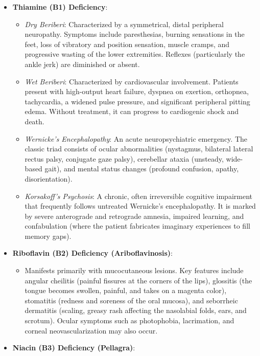 \begin{itemize}
    \item \textbf{Thiamine (B1) Deficiency}:
    \begin{itemize}
        \item \textit{Dry Beriberi}: Characterized by a symmetrical, distal peripheral neuropathy. Symptoms include paresthesias, burning sensations in the feet, loss of vibratory and position sensation, muscle cramps, and progressive wasting of the lower extremities. Reflexes (particularly the ankle jerk) are diminished or absent.
        \item \textit{Wet Beriberi}: Characterized by cardiovascular involvement. Patients present with high-output heart failure, dyspnea on exertion, orthopnea, tachycardia, a widened pulse pressure, and significant peripheral pitting edema. Without treatment, it can progress to cardiogenic shock and death.
        \item \textit{Wernicke's Encephalopathy}: An acute neuropsychiatric emergency. The classic triad consists of ocular abnormalities (nystagmus, bilateral lateral rectus palsy, conjugate gaze palsy), cerebellar ataxia (unsteady, wide-based gait), and mental status changes (profound confusion, apathy, disorientation).
        \item \textit{Korsakoff's Psychosis}: A chronic, often irreversible cognitive impairment that frequently follows untreated Wernicke's encephalopathy. It is marked by severe anterograde and retrograde amnesia, impaired learning, and confabulation (where the patient fabricates imaginary experiences to fill memory gaps).
    \end{itemize}
    \item \textbf{Riboflavin (B2) Deficiency (Ariboflavinosis)}:
    \begin{itemize}
        \item Manifests primarily with mucocutaneous lesions. Key features include angular cheilitis (painful fissures at the corners of the lips), glossitis (the tongue becomes swollen, painful, and takes on a magenta color), stomatitis (redness and soreness of the oral mucosa), and seborrheic dermatitis (scaling, greasy rash affecting the nasolabial folds, ears, and scrotum). Ocular symptoms such as photophobia, lacrimation, and corneal neovascularization may also occur.
    \end{itemize}
    \item \textbf{Niacin (B3) Deficiency (Pellagra)}:
    \begin{itemize}

\end{itemize}
\end{itemize}
